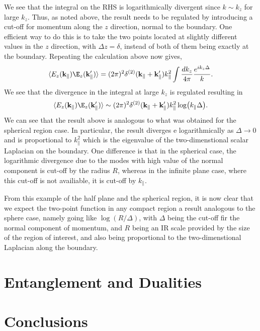 We see that the integral on the RHS is logarithmically divergent since $k\sim
k_z$ for large $k_z$. Thus, as noted above, the result needs to be regulated by
introducing a cut-off for momentum along the $z$ direction, normal to the
boundary. One efficient way to do this is to take the two points located at
slightly different values in the $z$ direction, with $\Delta z = \delta$,
instead of both of them being exactly at the boundary. Repeating the 
calculation above now gives,
\begin{equation}
  \langle E_z(\mathbf{k}_{\|})\E_z(\mathbf{k}_{\|}')\rangle
  = (2\pi)^2\delta^{(2)}(\mathbf{k}_{\|}
  + \mathbf{k}_{\|}')k^2_{\|}\int{\frac{dk_z}{4\pi}\frac{e^{ik_z\Delta}}{k}}.
\end{equation}
We see that the divergence in the integral at large $k_z$ is regulated
resulting in
\begin{equation}
  \langle E_z(\mathbf{k}_{\|})\E_z(\mathbf{k}_{\|}')\rangle
  \sim (2\pi)^2\delta^{(2)}(\mathbf{k}_{\|}
  + \mathbf{k}_{\|}')k^2_{\|}\log(k_{\|}\Delta).
\end{equation}
We can see that the result above is analogous to what was obtained for the
spherical region case. In particular, the result diverges e logarithmically as 
$\Delta\rightarrow 0$ and is proportional to $k^2_{\|}$ which is the eigenvalue
of the two-dimenstional scalar Laplacian on the boundary. One difference is
that in the spherical case, the logarithmic divergence due to the modes
with high value of the normal component is cut-off by the radius $R$, whereas
in the infinite plane case, where this cut-off is not availiable, it is
cut-off by $k_{\|}$.
\par From this example of the half plane and the spherical region, it is now
clear that we expect the two-point function in any compact region a result
analogous to the sphere case, namely going like $\log(R/\Delta)$, with $\Delta$
being the cut-off fir the normal component of momentum, and $R$ being an IR
scale provided by the size of the region of interest, and also being
proportional to the two-dimenstional Laplacian along the boundary.






\section{Entanglement and Dualities}
\section{Conclusions}

